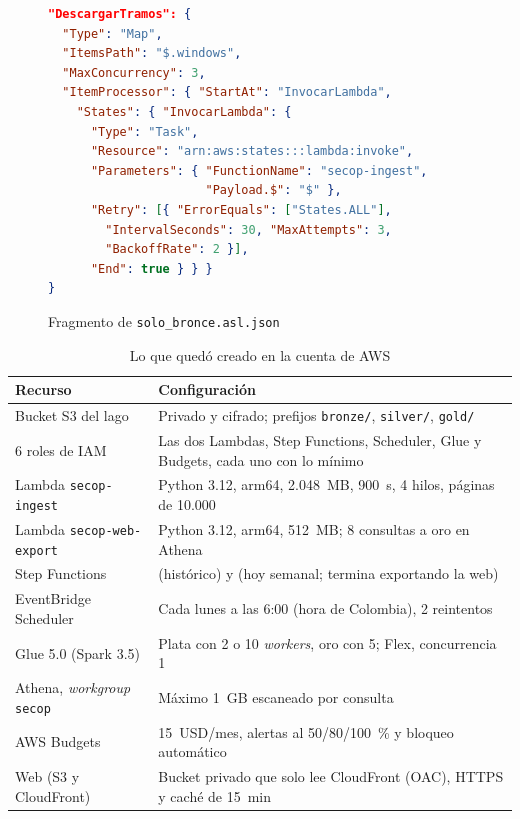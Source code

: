 \begin{figure}[!htbp]



\begin{lstlisting}[language=json]
"DescargarTramos": {
  "Type": "Map",
  "ItemsPath": "$.windows",
  "MaxConcurrency": 3,
  "ItemProcessor": { "StartAt": "InvocarLambda",
    "States": { "InvocarLambda": {
      "Type": "Task",
      "Resource": "arn:aws:states:::lambda:invoke",
      "Parameters": { "FunctionName": "secop-ingest",
                      "Payload.$": "$" },
      "Retry": [{ "ErrorEquals": ["States.ALL"],
        "IntervalSeconds": 30, "MaxAttempts": 3,
        "BackoffRate": 2 }],
      "End": true } } }
}
\end{lstlisting}
\caption{Fragmento de \texttt{solo\_bronce.asl.json}}\label{cloud:lst:sfn}
\end{figure}

\begin{table}[!htbp]
\caption{Lo que quedó creado en la cuenta de AWS}\label{cloud:tab:recursos}
\centering
\footnotesize
\begin{tabular}{@{}Q{0.28\columnwidth}Q{0.68\columnwidth}@{}}
\toprule
\textbf{Recurso} & \textbf{Configuración} \\
\midrule
Bucket S3 del lago & Privado y cifrado; prefijos \texttt{bronze/}, \texttt{silver/}, \texttt{gold/} \\
6 roles de IAM & Las dos Lambdas, Step Functions, Scheduler, Glue y Budgets, cada uno con lo mínimo \\
Lambda \texttt{secop-ingest} & Python 3.12, arm64, 2.048~MB, 900~s, 4 hilos, páginas de 10.000 \\
Lambda \texttt{secop-web-export} & Python 3.12, arm64, 512~MB; 8 consultas a oro en Athena \\
Step Functions &  (histórico) y  (hoy semanal; termina exportando la web) \\
EventBridge Scheduler & Cada lunes a las 6:00 (hora de Colombia), 2 reintentos \\
Glue 5.0 (Spark 3.5) & Plata con 2 o 10 \textit{workers}, oro con 5; Flex, concurrencia 1~\cite{aws_glue_iceberg} \\
Athena, \emph{workgroup} \texttt{secop} & Máximo 1~GB escaneado por consulta \\
AWS Budgets & 15~USD/mes, alertas al 50/80/100~\% y bloqueo automático \\
Web (S3 y CloudFront) & Bucket privado que solo lee CloudFront (OAC), HTTPS y caché de 15~min \\
\bottomrule
\end{tabular}
\end{table}

